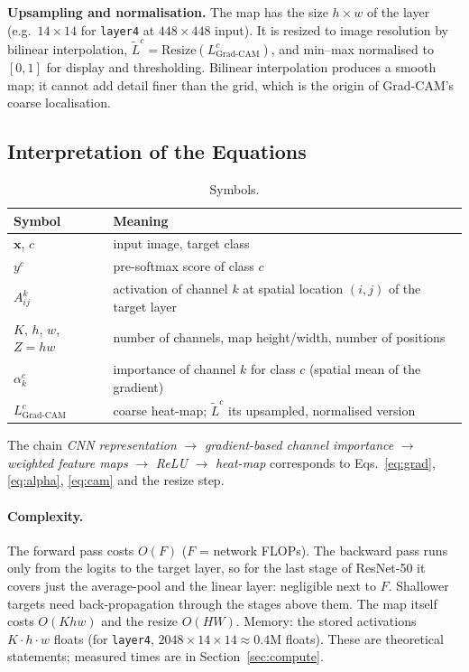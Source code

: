 \documentclass[11pt,a4paper]{article}
\newcommand{\GC}{Grad-CAM}
\begin{document}
\textbf{Upsampling and normalisation.} The map has the size $h\times w$ of the layer (e.g.\ $14\times14$ for \texttt{layer4} at $448\times448$ input). It is resized to image resolution by bilinear interpolation, $\tilde L^c=\mathrm{Resize}(L^c_{\text{\GC}})$, and min--max normalised to $[0,1]$ for display and thresholding. Bilinear interpolation produces a smooth map; it cannot add detail finer than the grid, which is the origin of \GC's coarse localisation.

\subsection{Interpretation of the Equations}
\begin{table}[h]\centering\caption{Symbols.}\small
\begin{tabular}{ll}\toprule
Symbol & Meaning \\ \midrule
$\bm x$, $c$ & input image, target class \\
$y^c$ & pre-softmax score of class $c$ \\
$A^k_{ij}$ & activation of channel $k$ at spatial location $(i,j)$ of the target layer \\
$K$, $h$, $w$, $Z=hw$ & number of channels, map height/width, number of positions \\
$\alpha_k^c$ & importance of channel $k$ for class $c$ (spatial mean of the gradient) \\
$L^c_{\text{\GC}}$ & coarse heat-map; $\tilde L^c$ its upsampled, normalised version \\ \bottomrule
\end{tabular}\end{table}
The chain \emph{CNN representation} $\rightarrow$ \emph{gradient-based channel importance} $\rightarrow$ \emph{weighted feature maps} $\rightarrow$ \emph{ReLU} $\rightarrow$ \emph{heat-map} corresponds to Eqs.~\eqref{eq:grad}, \eqref{eq:alpha}, \eqref{eq:cam} and the resize step.
\paragraph{Complexity.} The forward pass costs $O(F)$ ($F$ = network FLOPs). The backward pass runs only from the logits to the target layer, so for the last stage of ResNet-50 it covers just the average-pool and the linear layer: negligible next to $F$. Shallower targets need back-propagation through the stages above them. The map itself costs $O(Khw)$ and the resize $O(HW)$. Memory: the stored activations $K\cdot h\cdot w$ floats (for \texttt{layer4}, $2048\times14\times14\approx0.4$M floats). These are theoretical statements; measured times are in Section~\ref{sec:compute}.
\end{document}
